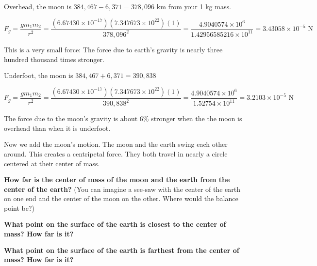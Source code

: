 \begin{Answer}[ref=life-orbits3]

Overhead, the moon is $384,467 - 6,371 = 378,096$ km from your 1 kg mass.

$$F_g =  \frac{g m_1 m_2}{r^2} = \frac{\left( 6.67430 \times 10^{-17} \right) \left( 7.347673 \times 10^{22} \right) \left(1\right)}{378,096^2} =  
\frac{4.9040574 \times 10^{6}}{1.42956585216 \times 10^{11}}  = 3.43058 \times 10^{-5} \text{ N}$$

This is a very small force: The force due to earth's gravity is nearly three hundred thousand times stronger.

Underfoot, the moon is $384,467 + 6,371 = 390,838$

$$F_g =  \frac{g m_1 m_2}{r^2} = \frac{\left( 6.67430 \times 10^{-17} \right) \left( 7.347673 \times 10^{22} \right) \left(1\right)}{390,838^2} =  \frac{4.9040574 \times 10^{6}}{1.52754 \times 10^{11}} =  3.2103 \times 10^{-5} \text{ N}$$

The force due to the moon's gravity is about 6\% stronger when the the moon is overhead than when it is underfoot. 

\end{Answer}

\begin{Exercise}[title={Life Among the Orbits 4: The Swing of the Moon}, label=life-orbits4]

Now we add the moon's motion.  The moon and the earth swing each other around.  This creates a centripetal force.  They both travel in nearly a circle centered at their center of mass.

\textbf{How far is the center of mass of the moon and the earth from the center of the earth?}  (You can imagine a see-saw with the center of the earth on one end and the center of the moon on the other.   Where would the balance point be?)

\textbf{What point on the surface of the earth is closest to the center of mass?  How far is it?}

\textbf{What point on the surface of the earth is farthest from the center of mass?  How far is it?}


\end{Exercise}

